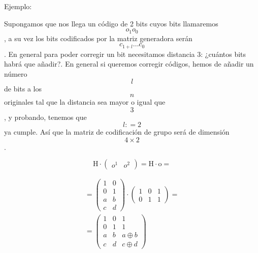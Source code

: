 \begin{enumerate}
\begin{enumerate}
\begin{enumerate}
\begin{enumerate}
        Ejemplo:

        Supongamos que nos llega un código de 2 bits cuyos bits
        llamaremos \[o_{1}o_{0}\], a su vez los bits codificados por la
        matriz generadora serán\[c_{1 + l}\ldots c_{0}\]. En general
        para poder corregir un bit necesitamos distancia 3: ¿cuántos
        bits habrá que añadir?. En general si queremos corregir códigos,
        hemos de añadir un número \[l\]de bits a los \[n\] originales
        tal que la distancia sea mayor o igual que\[3\], y probando,
        tenemos que \[l{: = 2}\] ya cumple. Así que la matriz de
        codificación de grupo será de dimensión\[4 \times 2\].

        \[{{\mathtt{\mathrm{H}} \cdot \begin{pmatrix}
        o^{1} & o^{2}
        \end{pmatrix}} = {\mathtt{\mathrm{H}} \cdot \mathtt{\mathrm{o}}}} =\]
      \end{enumerate}
    \end{enumerate}
  \end{enumerate}
\end{enumerate}

\[\begin{matrix}
{{= {\begin{pmatrix}
1 & 0 \\
0 & 1 \\
a & b \\
c & d
\end{pmatrix} \cdot \begin{pmatrix}
1 & 0 & 1 \\
0 & 1 & 1
\end{pmatrix}}} =} \\
{= \begin{pmatrix}
1 & 0 & 1 \\
0 & 1 & 1 \\
a & b & {a \oplus b} \\
c & d & {c \oplus d}
\end{pmatrix}}
\end{matrix}\]

